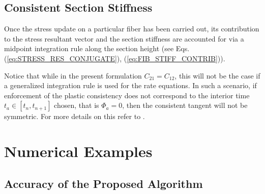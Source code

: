 \subsection{Consistent Section Stiffness}\label{section:CH3-S4SS3}

Once the stress update on a particular fiber has been carried out, its
contribution to the stress resultant vector and the section stiffness are
accounted for via a midpoint integration rule along the section height (see Eqs.
(\ref{eq:STRESS_RES_CONJUGATE}), (\ref{eq:FIB_STIFF_CONTRIB})).

Notice that while in the present formulation $C_{21}=C_{12}$, this will not be
the case if a generalized integration rule is used for the rate equations. In
such a scenario, if enforcement of the plastic consistency does not correspond
to the interior time $t_a\in[t_n, t_{n+1}]$ chosen, that is $\Phi_a=0$, then 
the consistent tangent will not be symmetric. For more details on this refer to
\cite{Ortiz1985}.

\section{Numerical Examples}\label{section:CH3-S5}

\subsection{Accuracy of the Proposed Algorithm}    %

